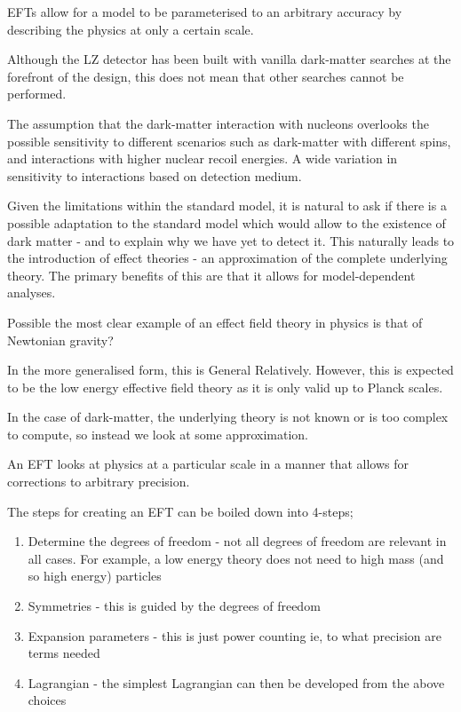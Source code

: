 \par
EFTs allow for a model to be parameterised to an arbitrary accuracy by describing the physics at only a certain scale.

Although the LZ detector has been built with vanilla dark-matter searches at the forefront of the design, this does not mean that other searches cannot be performed. 

\par
The assumption that the dark-matter interaction with nucleons overlooks the possible sensitivity to different scenarios such as dark-matter with different spins, and interactions with higher nuclear recoil energies.
A wide variation in sensitivity to interactions based on detection medium.

\par
Given the limitations within the standard model, it is natural to ask if there is a possible adaptation to the standard model which would allow to the existence of dark matter - and to explain why we have yet to detect it.
This naturally leads to the introduction of effect theories - an approximation of the complete underlying theory.
The primary benefits of this are that it allows for model-dependent analyses.

\par
Possible the most clear example of an effect field theory in physics is that of Newtonian gravity?

\par
In the more generalised form, this is General Relatively.
However, this is expected to be the low energy effective field theory as it is only valid up to Planck scales.


\par
In the case of dark-matter, the underlying theory is not known or is too complex to compute, so instead we look at some approximation.

\par
An EFT looks at physics at a particular scale in a manner that allows for corrections to arbitrary precision.


\par
The steps for creating an EFT can be boiled down into 4-steps;
\begin{enumerate}
    \item Determine the degrees of freedom - not all degrees of freedom are relevant in all cases. For example, a low energy theory does not need to high mass (and so high energy) particles
    \item Symmetries - this is guided by the degrees of freedom
    \item Expansion parameters - this is just power counting ie, to what precision are terms needed
    \item Lagrangian - the simplest Lagrangian can then be developed from the above choices
\end{enumerate}


